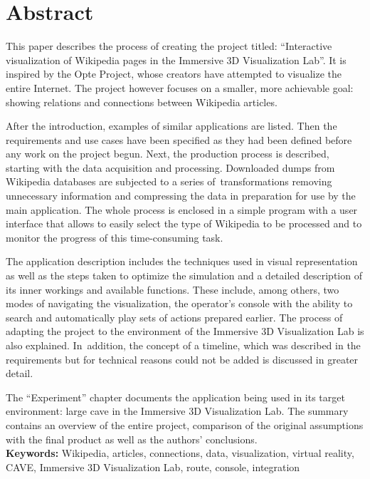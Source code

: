 \chapter*{Abstract}
This paper describes the process of creating the project titled: ``Interactive visualization of Wikipedia pages in the Immersive 3D Visualization Lab''. It is inspired by the Opte Project, whose creators have attempted to visualize the entire Internet. The project however focuses on a smaller, more achievable goal: showing relations and connections between Wikipedia articles.

After the introduction, examples of similar applications are listed. Then the requirements and use cases have been specified as they had been defined before any work on the project begun. Next, the production process is described, starting with the data acquisition and processing. Downloaded dumps from Wikipedia databases are subjected to a series of~transformations removing unnecessary information and compressing the data in preparation for use by the main application. The whole process is enclosed in a simple program with a user interface that allows to easily select the type of Wikipedia to be processed and to monitor the progress of this time-consuming task.

The application description includes the techniques used in visual representation as well as the steps taken to optimize the simulation and a detailed description of its inner workings and available functions. These include, among others, two modes of navigating the visualization, the operator's console with the ability to search and automatically play sets of actions prepared earlier. The process of adapting the project to the environment of the Immersive 3D Visualization Lab is also explained. In~addition, the concept of a timeline, which was described in the requirements but for technical reasons could not be added is discussed in greater detail.

The ``Experiment'' chapter documents the application being used in its target environment: large cave in the Immersive 3D Visualization Lab. The summary contains an overview of the entire project, comparison of the original assumptions with the final product as well as the authors' conclusions.\\

\noindent\textbf{Keywords:} Wikipedia, articles, connections, data, visualization, virtual reality, CAVE, Immersive 3D Visualization Lab, route, console, integration
